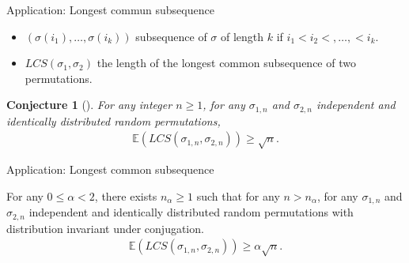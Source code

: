 \documentclass[english,xcolor=table]{beamer}
\newtheorem{conjecture}[theorem]{Conjecture}
\begin{document}
\begin{frame}{Application: Longest commun subsequence}
\begin{itemize}
\item $(\sigma(i_1),\dots,\sigma(i_k))$ subsequence of $\sigma$ of length $k$ if $ i_1<i_2<,\dots,<i_k$.
\item $LCS(\sigma_1,\sigma_2)$ the length of the longest common subsequence of two permutations.
\end{itemize}

\begin{conjecture}[\cite{MR3509473}]
 For any integer $n\geq 1$,  for any $\sigma_{1,n}$ and $\sigma_{2,n}$   independent and identically distributed  random permutations,
\begin{align*}
    \mathbb{E}(LCS(\sigma_{1,n},\sigma_{2,n}))\geq \sqrt{n}.
\end{align*}
\end{conjecture}
\end{frame}
\begin{frame}{Application: Longest common subsequence}


\begin{theorem}\label{thmp}
For any $0\leq \alpha<2$, there exists $n_\alpha\geq 1$ such that for any $n>n_\alpha$, for any $\sigma_{1,n}$ and $\sigma_{2,n}$   independent and identically distributed  random permutations with distribution invariant under conjugation.
\begin{align*}
    \mathbb{E}(LCS(\sigma_{1,n},\sigma_{2,n}))\geq \alpha\sqrt{n}.
\end{align*}
\end{theorem}

  
\end{frame}
\end{document}
